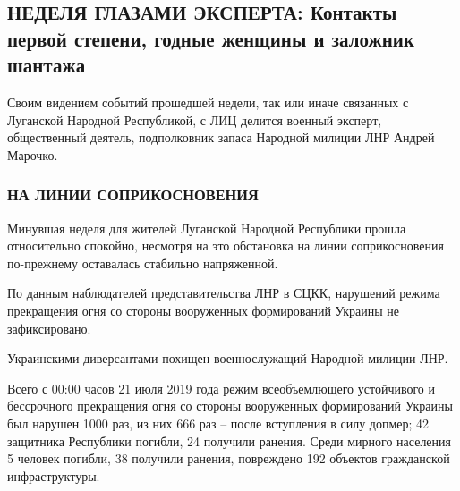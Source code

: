  
 
 
 
 
\subsection{НЕДЕЛЯ ГЛАЗАМИ ЭКСПЕРТА: Контакты первой степени, годные женщины и заложник шантажа}
\label{sec:02_01_2022.stz.news.lnr.lug_info.1.marochko_itogi}


\begin{zznagolos}
Своим видением событий прошедшей недели, так или иначе связанных с Луганской
Народной Республикой, с ЛИЦ делится военный эксперт, общественный деятель,
подполковник запаса Народной милиции ЛНР Андрей Марочко.
\end{zznagolos}


\subsubsection{НА ЛИНИИ СОПРИКОСНОВЕНИЯ}

Минувшая неделя для жителей Луганской Народной Республики прошла относительно
спокойно, несмотря на это обстановка на линии соприкосновения по-прежнему
оставалась стабильно напряженной.

По данным наблюдателей представительства ЛНР в СЦКК, нарушений режима
прекращения огня со стороны вооруженных формирований Украины не зафиксировано.

Украинскими диверсантами похищен военнослужащий Народной милиции ЛНР.

Всего с 00:00 часов 21 июля 2019 года режим всеобъемлющего устойчивого и
бессрочного прекращения огня со стороны вооруженных формирований Украины был
нарушен 1000 раз, из них 666 раз – после вступления в силу допмер; 42 защитника
Республики погибли, 24 получили ранения. Среди мирного населения 5 человек
погибли, 38 получили ранения, повреждено 192 объектов гражданской
инфраструктуры.

